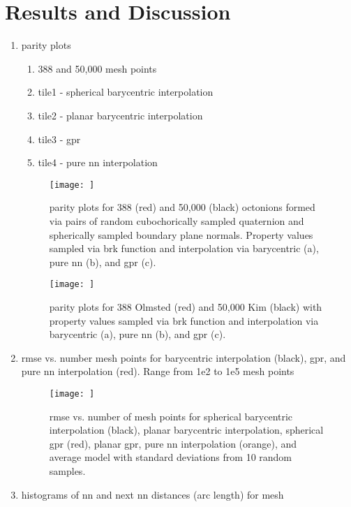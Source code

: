 \section{Results and Discussion} \label{sec:resultsDiscussion}
\begin{enumerate}
    \item parity plots
    \begin{enumerate}
        \item 388 and 50,000 mesh points
        \item tile1 - spherical barycentric interpolation
        \item tile2 - planar barycentric interpolation
        \item tile3 - \gls{gpr}
        \item tile4 - pure \gls{nn} interpolation
    \end{enumerate}
    \begin{figure}
        \centering
        \texttt{[image: ]}
        \caption{parity plots for 388 (red) and 50,000 (black) octonions formed via pairs of random cubochorically sampled quaternion and spherically sampled boundary plane normals. Property values sampled via \acrlong{brk} function and interpolation via barycentric (a), pure \acrlong{nn} (b), and \acrlong{gpr} (c).}
        \label{fig:brk-parity1}
    \end{figure}
    \begin{figure}
        \centering
        \texttt{[image: ]}
        \caption{parity plots for 388 Olmsted  (red) and 50,000 Kim  (black) with property values sampled via \acrlong{brk} function and interpolation via barycentric (a), pure \acrlong{nn} (b), and \acrlong{gpr} (c).}
        \label{fig:brk-parity2}
    \end{figure}
    \item \Gls{rmse} vs. number mesh points for barycentric interpolation (black), \gls{gpr}, and pure \gls{nn} interpolation (red). Range from 1e2 to 1e5 mesh points
    \begin{figure}
        \centering
        \texttt{[image: ]}
        \caption{\acrlong{rmse} vs. number of mesh points for spherical barycentric interpolation (black), planar barycentric interpolation, spherical \acrlong{gpr} (red), planar \gls{gpr}, pure \acrlong{nn} interpolation (orange), and average model with standard deviations from 10 random samples.}
        \label{fig:brk-rmse}
    \end{figure}
    \item histograms of \gls{nn} and next \gls{nn} distances (arc length) for mesh

\end{enumerate}
